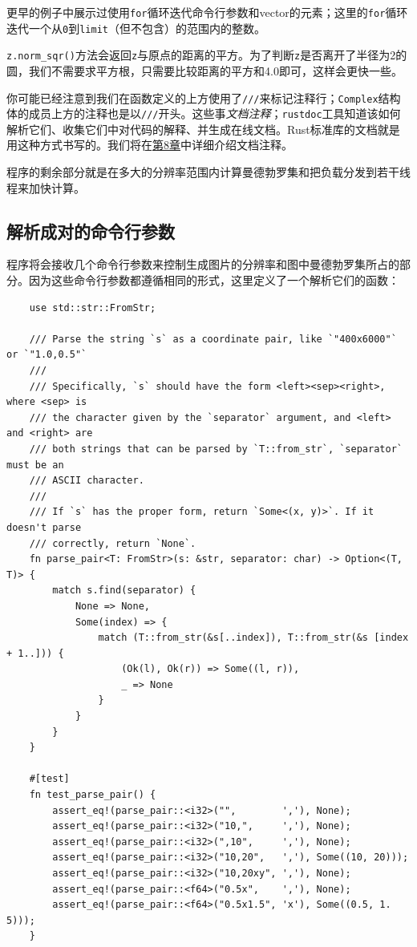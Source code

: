 更早的例子中展示过使用\texttt{for}循环迭代命令行参数和vector的元素；这里的\texttt{for}循环迭代一个从\texttt{0}到\texttt{limit}（但不包含）的范围内的整数。

\texttt{z.norm\_sqr()}方法会返回\texttt{z}与原点的距离的平方。为了判断\texttt{z}是否离开了半径为2的圆，我们不需要求平方根，只需要比较距离的平方和4.0即可，这样会更快一些。

你可能已经注意到我们在函数定义的上方使用了\texttt{///}来标记注释行；\texttt{Complex}结构体的成员上方的注释也是以\texttt{///}开头。这些事\emph{文档注释}；\texttt{rustdoc}工具知道该如何解析它们、收集它们中对代码的解释、并生成在线文档。Rust标准库的文档就是用这种方式书写的。我们将在\hyperref[ch08]{第8章}中详细介绍文档注释。

程序的剩余部分就是在多大的分辨率范围内计算曼德勃罗集和把负载分发到若干线程来加快计算。

\subsection{解析成对的命令行参数}
程序将会接收几个命令行参数来控制生成图片的分辨率和图中曼德勃罗集所占的部分。因为这些命令行参数都遵循相同的形式，这里定义了一个解析它们的函数：
\begin{verbatim}
    use std::str::FromStr;

    /// Parse the string `s` as a coordinate pair, like `"400x6000"` or `"1.0,0.5"`
    ///
    /// Specifically, `s` should have the form <left><sep><right>, where <sep> is
    /// the character given by the `separator` argument, and <left> and <right> are
    /// both strings that can be parsed by `T::from_str`, `separator` must be an
    /// ASCII character.
    ///
    /// If `s` has the proper form, return `Some<(x, y)>`. If it doesn't parse
    /// correctly, return `None`.
    fn parse_pair<T: FromStr>(s: &str, separator: char) -> Option<(T, T)> {
        match s.find(separator) {
            None => None,
            Some(index) => {
                match (T::from_str(&s[..index]), T::from_str(&s [index + 1..])) {
                    (Ok(l), Ok(r)) => Some((l, r)),
                    _ => None
                }
            }
        }
    }

    #[test]
    fn test_parse_pair() {
        assert_eq!(parse_pair::<i32>("",        ','), None);
        assert_eq!(parse_pair::<i32>("10,",     ','), None);
        assert_eq!(parse_pair::<i32>(",10",     ','), None);
        assert_eq!(parse_pair::<i32>("10,20",   ','), Some((10, 20)));
        assert_eq!(parse_pair::<i32>("10,20xy", ','), None);
        assert_eq!(parse_pair::<f64>("0.5x",    ','), None);
        assert_eq!(parse_pair::<f64>("0.5x1.5", 'x'), Some((0.5, 1. 5)));
    }
\end{verbatim}

